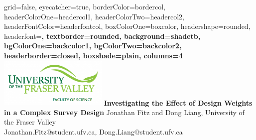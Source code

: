 \documentclass[paperwidth=58in,paperheight=47in,portrait]{baposter}
\begin{document}


\begin{poster}{
	grid=false,
	eyecatcher=true, 
	borderColor=bordercol,
	headerColorOne=headercol1,
	headerColorTwo=headercol2,
	headerFontColor=headerfontcol,
	boxColorOne=boxcolor,
	headershape=rounded,
	headerfont=\Large\sf\bf,
	textborder=rounded,
	background=shadetb,
	bgColorOne=backcolor1,
	bgColorTwo=backcolor2,
	headerborder=closed,
  boxshade=plain,
  columns=4
}
{
			\includegraphics[width=14em]{UFV.png}
}
{\sf\bf
	\color{titlecol}Investigating the Effect of Design Weights in a Complex Survey Design
}
{
	\vspace{1em} Jonathan Fitz and Dong Liang, University of the Fraser Valley\\
	{\smaller Jonathan.Fitz@student.ufv.ca, Dong.Liang@student.ufv.ca}
}

\end{poster}
\end{document}
